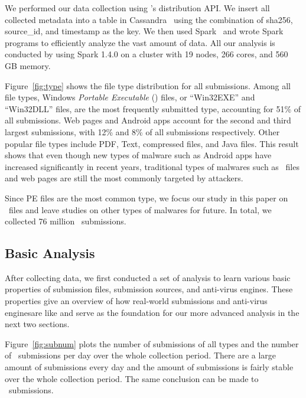 We performed our data collection using \vt{}’s distribution API.
We insert all collected metadata into a table in Cassandra~\cite{cassandra} 
using the combination of sha256, source\_id, and timestamp as the key.
We then used Spark~\cite{spark} and wrote Spark programs to efficiently analyze the vast amount of data.
All our analysis is conducted by using Spark 1.4.0 on a cluster with 19 nodes, 266 cores, and 560 GB memory. 



Figure~\ref{fig:type} shows the file type distribution for all submissions. 
Among all file types, Windows \textit{Portable Executable} ({\em \pe}) files, or ``Win32EXE'' and ``Win32DLL'' files, 
are the most frequently submitted type,
accounting for 51\% of all submissions.
Web pages and Android apps account for the second and third largest submissions, 
with 12\% and 8\% of all submissions respectively. 
Other popular file types include PDF, Text, compressed files, and Java files. 
This result shows that even though new types of malware such as Android apps have
increased significantly in recent years, 
traditional types of malwares such as \pe\ files and web pages are still the 
most commonly targeted by attackers.

Since PE files are the most common type,
we focus our study in this paper on \pe\ files 
and leave studies on other types of malwares for future. 
In total, we collected 76 million \pe\ submissions.

\subsection{Basic Analysis}
\label{sec:basicanal}
After collecting data, we first conducted a set of analysis 
to learn various basic properties of submission files, 
submission sources, and anti-virus engines.
These properties give an overview of how real-world submissions and anti-virus enginesare like
and serve as the foundation for our more advanced analysis in the next two sections. 





Figure~\ref{fig:subnum} plots the number of submissions of all types and the number of \pe\ submissions per day 
over the whole collection period.
There are a large amount of submissions every day
and the amount of submissions is fairly stable over the whole collection period.
The same conclusion can be made to \pe\ submissions.

